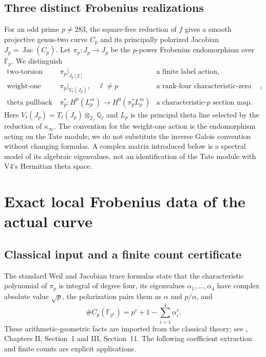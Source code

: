 \documentclass[11pt]{article}
\theoremstyle{definition}
\theoremstyle{remark}
\newcommand{\F}{\mathbb F}
\newcommand{\Q}{\mathbb Q}
\newcommand{\Z}{\mathbb Z}
\begin{document}
\subsection{Three distinct Frobenius realizations}
For an odd prime $p\ne283$, the square-free reduction of $f$ gives a smooth
projective genus-two curve $C_p$ and its principally polarized Jacobian
$J_p=\operatorname{Jac}(C_p)$. Let $\pi_p:J_p\to J_p$ be the $p$-power
Frobenius endomorphism over $\F_p$. We distinguish
\[
 \begin{array}{lll}
 \text{two-torsion action}&\pi_p|_{J_p[2]}&\text{a finite label action},\\
 \text{weight-one action}&\pi_p|_{V_\ell(J_p)},\quad \ell\ne p
     &\text{a rank-four characteristic-zero action},\\
 \text{theta pullback}&\pi_p^*:H^0(L_p^m)\to H^0(\pi_p^*L_p^m)
     &\text{a characteristic-$p$ section map}.
 \end{array}
\]
Here $V_\ell(J_p)=T_\ell(J_p)\otimes_{\Z_\ell}\Q_\ell$ and $L_p$ is the
principal theta line selected by the reduction of $\kappa_\infty$.
The convention for the weight-one action is the endomorphism acting on the
Tate module; we do not substitute the inverse Galois convention without
changing formulas. A complex matrix introduced below is a spectral model
of its algebraic eigenvalues, not an identification of the Tate module with
V4's Hermitian theta space.

\section{Exact local Frobenius data of the actual curve}
\label{sec:v5-counts}

\subsection{Classical input and a finite count certificate}
The standard Weil and Jacobian trace formulas state that the characteristic
polynomial of $\pi_p$ is integral of degree four, its eigenvalues
$\alpha_1,\ldots,\alpha_4$ have complex absolute value $\sqrt p$, the
polarization pairs them as $\alpha$ and $p/\alpha$, and
\[
 \#C_p(\F_{p^r})=p^r+1-\sum_{i=1}^4\alpha_i^r.
\]
These arithmetic-geometric facts are imported from the classical theory;
see \cite{MilneAV}, Chapters II, Section~1 and III, Section~11. The following
coefficient extraction and finite counts are explicit applications.
\end{document}
